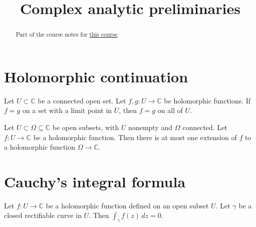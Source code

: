 \documentclass[reqno]{amsart} 
\begin{document}
 

\title{Complex analytic preliminaries}
\begin{abstract}
  Part of the course notes for \href{2023-introduction-to-zeta-and-l-functions.pdf}{this course}.
\end{abstract}

\section{Holomorphic continuation}\label{sec:cj41z47j43}

\begin{theorem}\label{theorem:cj41z47je7}
  Let $U \subset \mathbb{C} $ be a connected open set.  Let $f, g : U \rightarrow \mathbb{C} $ be holomorphic functions.  If $f = g$ on a set with a limit point in $U$, then $f = g$ on all of $U$.
\end{theorem}
\begin{corollary}\label{corollary:cj3vqbthht}
  Let $U \subset \Omega \subseteq \mathbb{C} $ be open subsets, with $U$ nonempty and $\Omega$ connected.  Let $f : U \rightarrow \mathbb{C}$ be a holomorphic function.  Then there is at most one extension of $f$ to a holomorphic function $\Omega \rightarrow \mathbb{C}$.
\end{corollary}

\section{Cauchy's integral formula}\label{sec:cj41z47ie0}
\begin{theorem}\label{theorem:cj41z47hph}
  Let $f : U \rightarrow \mathbb{C} $ be a holomorphic function defined on an open subset $U$.  Let $\gamma$ be a closed rectifiable curve in $U$.  Then $\int_\gamma f(z) \, d z = 0$.
\end{theorem}
\end{document}
